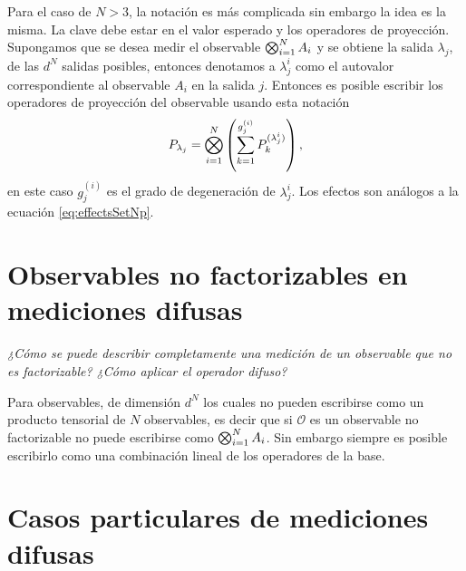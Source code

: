 \documentclass[12pt,oneside]{book}\raggedbottom{}
\begin{document}
Para el caso de $N>3$, la notación es más complicada sin embargo la idea es la misma. La clave debe estar en el valor esperado y los operadores de proyección.  Supongamos que se desea medir el observable $\bigotimes_{i=1}^{N} A_i$ y se obtiene la salida $\lambda_j$, de las $d^{N}$ salidas posibles, entonces denotamos a $\lambda_{j}^{i}$ como el autovalor correspondiente al observable $A_i$ en la salida $j$. Entonces es posible escribir los operadores de proyección del observable usando esta notación \[P_{\lambda_j}=\bigotimes_{i=1}^{N} \left(\sum_{k=1}^{g_{j}^{(i)}} P_k^{(\lambda_j^{i})}\right),\] en este caso $g_j^{(i)}$  es el grado de degeneración de $\lambda_{j}^{i}$. Los efectos son análogos a la ecuación {\eqref{eq:effectsSetNp}}.

\section*{Observables no factorizables en mediciones difusas}
\textit{¿Cómo se puede describir completamente una medición de un observable que no es factorizable? ¿Cómo aplicar el operador difuso?}

Para observables, de dimensión $d^N$ los cuales no pueden escribirse como un producto tensorial de $N$ observables, es decir que si $\mathcal{O}$ es un observable no factorizable no puede escribirse como $\bigotimes_{i=1}^{N} A_i$. Sin embargo siempre es posible escribirlo como una combinación lineal de los operadores de la base.  

\section*{Casos particulares de mediciones difusas}

\textit{}
\end{document}
